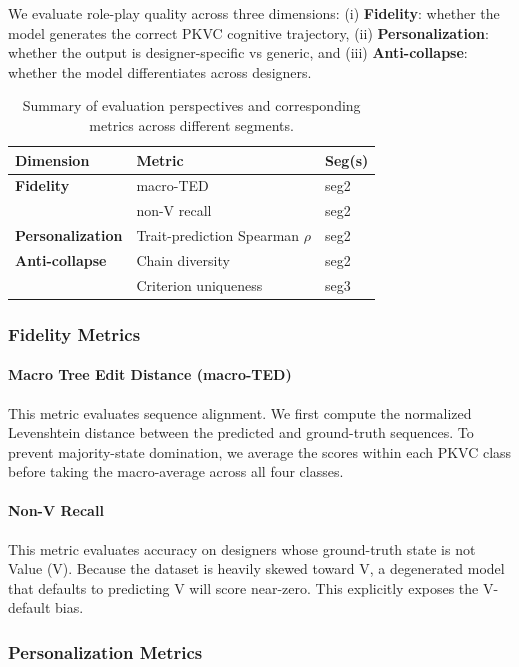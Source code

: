 \documentclass[11pt]{article}
\begin{document}
We evaluate role-play quality across three dimensions: (i) \textbf{Fidelity}: whether the model generates the correct PKVC cognitive trajectory, (ii) \textbf{Personalization}: whether the output is designer-specific vs generic, and (iii) \textbf{Anti-collapse}: whether the model differentiates across designers. 
\begin{table}[t]
\centering
\small
\caption{Summary of evaluation perspectives and corresponding metrics across different segments.}
\label{tab:evaluation_metrics_single}
\begin{tabular}{p{1.9cm} p{3.5cm} l}
\toprule
\textbf{Dimension} & \textbf{Metric} & \textbf{Seg(s)} \\
\midrule
\textbf{Fidelity} 
 & macro-TED & seg2 \\
 & non-V recall & seg2 \\
\midrule
\textbf{Personalization} 
 & Trait-prediction Spearman $\rho$ & seg2 \\
\midrule
\textbf{Anti-collapse} 
 & Chain diversity & seg2 \\
 & Criterion uniqueness & seg3 \\
\bottomrule
\end{tabular}
\end{table}

\subsubsection{Fidelity Metrics}

\paragraph{Macro Tree Edit Distance (macro-TED)}
This metric evaluates sequence alignment. We first compute the normalized Levenshtein distance between the predicted and ground-truth sequences. To prevent majority-state domination, we average the scores within each PKVC class before taking the macro-average across all four classes.

\paragraph{Non-V Recall}
This metric evaluates accuracy on designers whose ground-truth state is not Value (V). Because the dataset is heavily skewed toward V, a degenerated model that defaults to predicting V will score near-zero. This explicitly exposes the V-default bias.

\subsubsection{Personalization Metrics}
\end{document}
